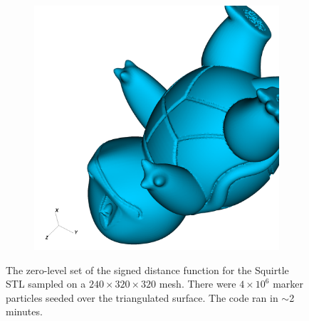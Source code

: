 \documentclass[final,3p,times,twocolumn]{elsarticle}
\begin{document}
\begin{figure}
\begin{subfigure}[b]{0.475\textwidth}
            \caption{}  
            \label{ef3}
        \end{subfigure}
        \quad
        \begin{subfigure}[b]{0.475\textwidth}   
            \centering 
            \includegraphics[width=\textwidth]{visit0021.png}
            \caption{}
            \label{ef4}
        \end{subfigure}
        \caption{The zero-level set of the signed distance function for the Squirtle STL sampled on a $240\times 320 \times 320$ mesh. There were $4\times 10^6$ marker particles seeded over the triangulated surface. The code ran in $\sim$2 minutes.}
        \label{SQ}
\end{figure}
\end{document}
